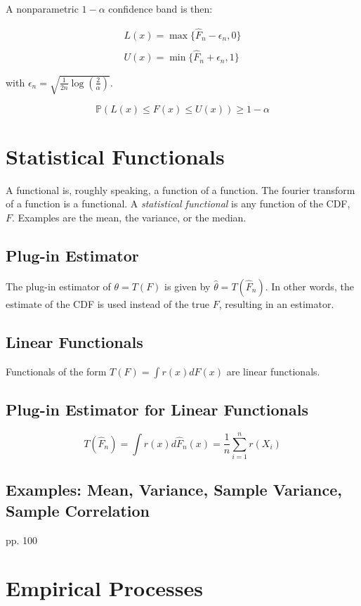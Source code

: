 A nonparametric $1-\alpha$ confidence band is then:

\begin{equation}
\begin{array}{c}
L(x) = \max\{\hat{F}_n -\epsilon_n, 0 \}\\
\\
U(x) = \min\{\hat{F}_n + \epsilon_n, 1\}
\end{array}
\end{equation}

with $\epsilon_n = \sqrt{\frac{1}{2n}\log\left(\frac{2}{\alpha}\right)}$.

\begin{equation}
\mathbb{P}\left(L(x) \leq F(x) \leq U(x) \right) \geq 1-\alpha
\end{equation}



\section{Statistical Functionals}
A functional is, roughly speaking, a function of a function. The fourier transform of a function is a functional. A \textit{statistical functional} is any function of the CDF, $F$. Examples are the mean, the variance, or the median. 

\subsection{Plug-in Estimator}
The plug-in estimator of $\theta = T(F)$ is given by $\hat{\theta} = T(\hat{F}_n)$. In other words, the estimate of the CDF is used instead of the true $F$, resulting in an estimator.

\subsection{Linear Functionals}
Functionals of the form $T(F) = \int r(x) dF(x)$ are linear functionals.  

\subsection{Plug-in Estimator for Linear Functionals}
\begin{equation}
T(\hat{F}_n) = \int r(x) d\hat{F}_n(x) = \frac{1}{n}\sum^{n}_{i=1}r(X_i)
\end{equation}

\subsection{Examples: Mean, Variance, Sample Variance, Sample Correlation}
 pp. 100

\section{Empirical Processes}

